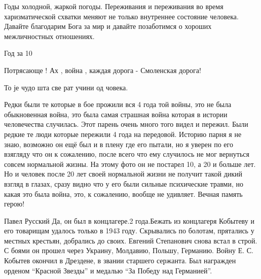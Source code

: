  
 
 
 
 
\begin{itemize}


Годы холодной, жаркой погоды. Переживания и переживания во время
харизматической схватки меняют не только внутреннее состояние человека.
Давайте благодарим Бога за мир и давайте позаботимся о хороших межличностных
отношениях.


Год за 10

Потрясающе ! Ах , война , каждая дорога - Смоленская дорога!


То је чудо шта све рат учини од човека.


Редки были те которые в бое прожили вся 4 года той войны, это не была
обыкновенная война, это была самая страшная война которая в истории
человечества случилась. Этот парень очень много того видел и пережил. Были
редкие те люди которые пережили 4 года на передовой. Историю парня я не знаю,
возможно он ещё был и в плену где его пытали, но я уверен по его взягляду что
он к сожалению, после всего что ему случилось не мог вернуться совсем
нормальной жизны. На этому фото он не постарел 10, а 20 и больше лет. Но и
человек после 20 лет своей нормальной жизни не получит такой дикий взгляд в
глазах, сразу видно что у его были сильные психические травми, но какая это
была война, это, к сожалению, вообще не удивляет. Вечная память герою!


Павел Русский Да, он был в концлагере.2 года.Бежать из концлагеря Кобытеву и
его товарищам удалось только в 1943 году. Скрывались по болотам, прятались у
местных крестьян, добрались до своих. Евгений Степанович снова встал в строй. С
боями он прошел через Украину, Молдавию, Польшу, Германию. Войну Е. С. Кобытев
окончил в Дрездене, в звании старшего сержанта. Был награжден орденом \enquote{Красной
Звезды} и медалью \enquote{За Победу над Германией}.


\end{itemize}
